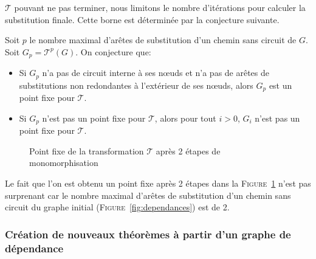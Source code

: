 $\mathcal{T}$ pouvant ne pas terminer, nous limitons le nombre
d'itérations pour calculer la substitution finale. Cette borne est
déterminée par la conjecture suivante.

\begin{conjecture}
Soit $p$ le nombre maximal d'arêtes de substitution d'un chemin sans circuit de $G$. \\Soit $G_p = \mathcal{T}^p(G)$. On conjecture que:
\begin{itemize}
\item Si $G_p$ n'a pas de circuit interne à ses nœuds et n'a pas de arêtes de substitutions non redondantes à l'extérieur de ses nœuds, alors $G_p$ est un point fixe pour $\mathcal{T}$.
\item Si $G_p$ n'est pas un point fixe pour $\mathcal{T}$, alors pour tout $i>0$, $G_i$ n'est pas un point fixe pour $\mathcal{T}$.
\end{itemize}
\end{conjecture}

\begin{figure}[h!]
\begin{center}
\end{center}
\caption{Point fixe de la transformation $\mathcal{T}$ après 2 étapes de monomorphisation}
\label{fig:point_fixe}
\end{figure}

\begin{remark}
Le fait que l'on est obtenu un point fixe après 2 étapes dans la \textsc{Figure}~\ref{fig:point_fixe} n'est pas surprenant car le nombre maximal d'arêtes de substitution d'un chemin sans circuit du graphe initial (\textsc{Figure}~\ref{fig:dependances}) est de 2.
\end{remark}

\subsubsection{Création de nouveaux théorèmes à partir d'un graphe de dépendance}

